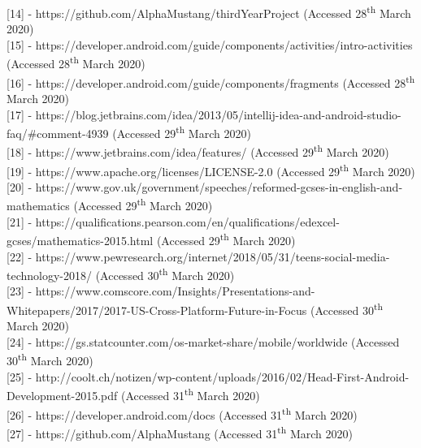 \documentclass{article}
\begin{document}
[14] - https://github.com/AlphaMustang/thirdYearProject (Accessed 28\textsuperscript{th} March 2020) \\

[15] - https://developer.android.com/guide/components/activities/intro-activities (Accessed 28\textsuperscript{th} March 2020) \\

[16] - https://developer.android.com/guide/components/fragments (Accessed 28\textsuperscript{th} March 2020) \\

[17] - https://blog.jetbrains.com/idea/2013/05/intellij-idea-and-android-studio-faq/\#comment-4939 (Accessed 29\textsuperscript{th} March 2020) \\

[18] - https://www.jetbrains.com/idea/features/ (Accessed 29\textsuperscript{th} March 2020) \\ 

[19] - https://www.apache.org/licenses/LICENSE-2.0 (Accessed 29\textsuperscript{th} March 2020) \\

[20] - https://www.gov.uk/government/speeches/reformed-gcses-in-english-and-mathematics (Accessed 29\textsuperscript{th} March 2020) \\

[21] - https://qualifications.pearson.com/en/qualifications/edexcel-gcses/mathematics-2015.html (Accessed 29\textsuperscript{th} March 2020) \\

[22] - https://www.pewresearch.org/internet/2018/05/31/teens-social-media-technology-2018/ (Accessed 30\textsuperscript{th} March 2020) \\

[23] - https://www.comscore.com/Insights/Presentations-and-Whitepapers/2017/2017-US-Cross-Platform-Future-in-Focus (Accessed 30\textsuperscript{th} March 2020) \\

[24] - https://gs.statcounter.com/os-market-share/mobile/worldwide (Accessed 30\textsuperscript{th} March 2020) \\

[25] - http://coolt.ch/notizen/wp-content/uploads/2016/02/Head-First-Android-Development-2015.pdf (Accessed 31\textsuperscript{th} March 2020) \\

[26] - https://developer.android.com/docs (Accessed 31\textsuperscript{th} March 2020) \\

[27] - https://github.com/AlphaMustang (Accessed 31\textsuperscript{th} March 2020)
\end{document}
